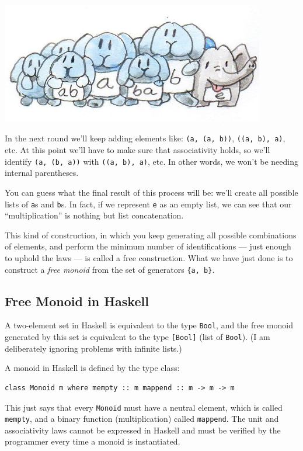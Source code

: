 \includegraphics[width=4.54167in]{images/bunnies.jpg}

In the next round we'll keep adding elements like:
\texttt{(a,\ (a,\ b))}, \texttt{((a,\ b),\ a)}, etc. At this point we'll
have to make sure that associativity holds, so we'll identify
\texttt{(a,\ (b,\ a))} with \texttt{((a,\ b),\ a)}, etc. In other words,
we won't be needing internal parentheses.

You can guess what the final result of this process will be: we'll
create all possible lists of \texttt{a}s and \texttt{b}s. In fact, if we
represent \texttt{e} as an empty list, we can see that our
``multiplication'' is nothing but list concatenation.

This kind of construction, in which you keep generating all possible
combinations of elements, and perform the minimum number of
identifications --- just enough to uphold the laws --- is called a free
construction. What we have just done is to construct a \emph{free
monoid} from the set of generators \texttt{\{a,\ b\}}.

\subsection{Free Monoid in Haskell}\label{free-monoid-in-haskell}

A two-element set in Haskell is equivalent to the type \texttt{Bool},
and the free monoid generated by this set is equivalent to the type
\texttt{{[}Bool{]}} (list of \texttt{Bool}). (I am deliberately ignoring
problems with infinite lists.)

A monoid in Haskell is defined by the type class:

\begin{verbatim}
class Monoid m where mempty :: m mappend :: m -> m -> m
\end{verbatim}

This just says that every \texttt{Monoid} must have a neutral element,
which is called \texttt{mempty}, and a binary function (multiplication)
called \texttt{mappend}. The unit and associativity laws cannot be
expressed in Haskell and must be verified by the programmer every time a
monoid is instantiated.

